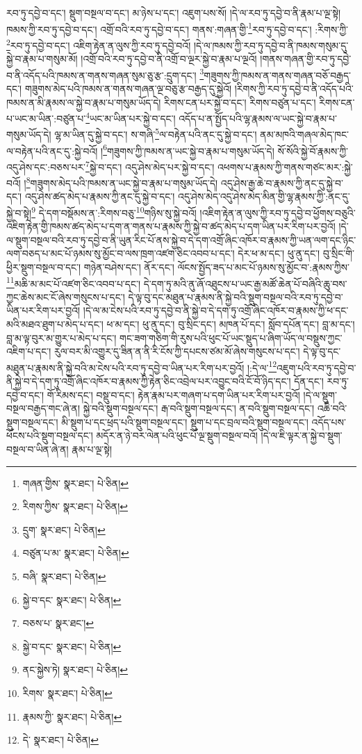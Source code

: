 རབ་ཏུ་དབྱེ་བ་དང་། སྡུག་བསྔལ་བ་དང་། མ་ཉེས་པ་དང་། འཇུག་པས་སོ། །དེ་ལ་རབ་ཏུ་དབྱེ་བ་ནི་རྣམ་པ་ལྔ་སྟེ། ཁམས་ཀྱི་རབ་ཏུ་དབྱེ་བ་དང་། འགྲོ་བའི་རབ་ཏུ་དབྱེ་བ་དང་། གནས་:གཞན་གྱི་\footnote{གཞན་གྱིས་  སྣར་ཐང་།  པེ་ཅིན། }རབ་ཏུ་དབྱེ་བ་དང་། :རིགས་ཀྱི་\footnote{རིགས་ཀྱིས་  སྣར་ཐང་།  པེ་ཅིན། }རབ་ཏུ་དབྱེ་བ་དང་། འཇིག་རྟེན་ན་ལུས་ཀྱི་རབ་ཏུ་དབྱེ་བའོ། །དེ་ལ་ཁམས་ཀྱི་རབ་ཏུ་དབྱེ་བ་ནི་ཁམས་གསུམ་དུ་སྐྱེ་བ་རྣམ་པ་གསུམ་མོ། །འགྲོ་བའི་རབ་ཏུ་དབྱེ་བ་ནི་འགྲོ་བ་ལྔར་སྐྱེ་བ་རྣམ་པ་ལྔའོ། །གནས་གཞན་གྱི་རབ་ཏུ་དབྱེ་བ་ནི་འདོད་པའི་ཁམས་ན་གནས་གཞན་སུམ་ཅུ་རྩ་:དྲུག་དང་། \footnote{དྲུག་  སྣར་ཐང་།  པེ་ཅིན། }གཟུགས་ཀྱི་ཁམས་ན་གནས་གཞན་བཅོ་བརྒྱད་དང་། གཟུགས་མེད་པའི་ཁམས་ན་གནས་གཞན་ལྔ་བཅུ་རྩ་བརྒྱད་དུ་སྐྱེའོ། །རིགས་ཀྱི་རབ་ཏུ་དབྱེ་བ་ནི་འདོད་པའི་ཁམས་ན་མི་རྣམས་ལ་སྐྱེ་བ་རྣམ་པ་གསུམ་ཡོད་དེ། རིགས་ངན་པར་སྐྱེ་བ་དང་། རིགས་བཙུན་པ་དང་། རིགས་ངན་པ་ཡང་མ་ཡིན་:བཙུན་པ་\footnote{བཙུན་པ་མ་  སྣར་ཐང་།  པེ་ཅིན། }ཡང་མ་ཡིན་པར་སྐྱེ་བ་དང་། འདོད་པ་ན་སྤྱོད་པའི་ལྷ་རྣམས་ལ་ཡང་སྐྱེ་བ་རྣམ་པ་གསུམ་ཡོད་དེ། ལྷ་མ་ཡིན་དུ་སྐྱེ་བ་དང་། ས་གཞི་\footnote{བཞི་  སྣར་ཐང་།  པེ་ཅིན། }ལ་བརྟེན་པའི་ནང་དུ་སྐྱེ་བ་དང་། ནམ་མཁའི་གཞལ་མེད་ཁང་ལ་བརྟེན་པའི་ནང་དུ་:སྐྱེ་བའོ། །\footnote{སྐྱེ་བ་དང་  སྣར་ཐང་།  པེ་ཅིན། }གཟུགས་ཀྱི་ཁམས་ན་ཡང་སྐྱེ་བ་རྣམ་པ་གསུམ་ཡོད་དེ། སོ་སོའི་སྐྱེ་བོ་རྣམས་ཀྱི་འདུ་ཤེས་དང་:བཅས་པར་\footnote{བཅས་པ་  སྣར་ཐང་། }སྐྱེ་བ་དང་། འདུ་ཤེས་མེད་པར་སྐྱེ་བ་དང་། འཕགས་པ་རྣམས་ཀྱི་གནས་གཙང་མར་:སྐྱེ་བའོ། །\footnote{སྐྱེ་བ་དང་  སྣར་ཐང་།  པེ་ཅིན། }གཟུགས་མེད་པའི་ཁམས་ན་ཡང་སྐྱེ་བ་རྣམ་པ་གསུམ་ཡོད་དེ། འདུ་ཤེས་རྒྱ་ཆེ་བ་རྣམས་ཀྱི་ནང་དུ་སྐྱེ་བ་དང་། འདུ་ཤེས་ཚད་མེད་པ་རྣམས་ཀྱི་ནང་དུ་སྐྱེ་བ་དང་། འདུ་ཤེས་མེད་འདུ་ཤེས་མེད་མིན་གྱི་ལྷ་རྣམས་ཀྱི་:ནང་དུ་སྐྱེ་བ་སྟེ།\footnote{ནང་སྐྱེས་ཏེ།  སྣར་ཐང་།  པེ་ཅིན། } དེ་དག་བསྡོམས་ན་:རིགས་བཅུ་\footnote{རིགས་  སྣར་ཐང་།  པེ་ཅིན། }གཉིས་སུ་སྐྱེ་བའོ། །འཇིག་རྟེན་ན་ལུས་ཀྱི་རབ་ཏུ་དབྱེ་བ་ཕྱོགས་བཅུའི་འཇིག་རྟེན་གྱི་ཁམས་ཚད་མེད་པ་དག་ན་གནས་པ་རྣམས་ཀྱི་སྐྱེ་བ་ཚད་མེད་པ་དག་ཡིན་པར་རིག་པར་བྱའོ། །དེ་ལ་སྡུག་བསྔལ་བའི་རབ་ཏུ་དབྱེ་བ་ནི་ཡུན་རིང་པོ་ནས་སྐྱེ་བ་དེ་དག་འགྲོ་ཞིང་འཁོར་བ་རྣམས་ཀྱི་ཡན་ལག་དང་ཉིང་ལག་བཅད་པ་མང་པོ་ཉམས་སུ་མྱོང་བ་ལས་ཁྲག་འཛག་ཅིང་འབབ་པ་དང་། དེར་ཕ་མ་དང་། ཕུ་ནུ་དང་། བུ་སྲིང་གི་ཕྱིར་སྡུག་བསྔལ་བ་དང་། གཉེན་བཤེས་དང་། ནོར་དང་། ལོངས་སྤྱོད་ཟད་པ་མང་པོ་ཉམས་སུ་མྱོང་བ་:རྣམས་ཀྱིས་\footnote{རྣམས་ཀྱི་  སྣར་ཐང་།  པེ་ཅིན། }མཆི་མ་མང་པོ་འཛག་ཅིང་འབབ་པ་དང་། དེ་དག་ཏུ་མའི་ནུ་ཞོ་འཐུངས་པ་ཡང་རྒྱ་མཚོ་ཆེན་པོ་བཞིའི་ཆུ་བས་ཀྱང་ཆེས་མང་ངོ་ཞེས་གསུངས་པ་དང་། དེ་ལྟ་བུ་དང་མཐུན་པ་རྣམས་ནི་སྐྱེ་བའི་སྡུག་བསྔལ་བའི་རབ་ཏུ་དབྱེ་བ་ཡིན་པར་རིག་པར་བྱའོ། །དེ་ལ་མ་ངེས་པའི་རབ་ཏུ་དབྱེ་བ་ནི་སྐྱེ་བ་དེ་དག་ཏུ་འགྲོ་ཞིང་འཁོར་བ་རྣམས་ཀྱི་ཕ་དང་མའི་མཐའ་ཐུག་པ་མེད་པ་དང་། ཕ་མ་དང་། ཕུ་ནུ་དང་། བུ་སྲིང་དང་། མཁན་པོ་དང་། སློབ་དཔོན་དང་། བླ་མ་དང་། བླ་མ་ལྟ་བུར་མ་གྱུར་པ་མེད་པ་དང་། གང་ཟག་གཅིག་གི་རུས་པའི་ཕུང་པོ་ཡང་སྡུད་པ་ཞིག་ཡོད་ལ་བསྡུས་ཀྱང་འཇིག་པ་དང་། རུལ་བར་མི་འགྱུར་དུ་ཟིན་ན་ནི་རི་ངོས་ཀྱི་དཔངས་ཙམ་མོ་ཞེས་གསུངས་པ་དང་། དེ་ལྟ་བུ་དང་མཐུན་པ་རྣམས་ནི་སྐྱེ་བའི་མ་ངེས་པའི་རབ་ཏུ་དབྱེ་བ་ཡིན་པར་རིག་པར་བྱའོ། །:དེ་ལ་\footnote{དེ་  སྣར་ཐང་།  པེ་ཅིན། }འཇུག་པའི་རབ་ཏུ་དབྱེ་བ་ནི་སྐྱེ་བ་དེ་དག་ཏུ་འགྲོ་ཞིང་འཁོར་བ་རྣམས་ཀྱི་རྟེན་ཅིང་འབྲེལ་པར་འབྱུང་བའི་ངོ་བོ་ཉིད་དང་། དོན་དང་། རབ་ཏུ་དབྱེ་བ་དང་། གོ་རིམས་དང་། བསྡུ་བ་དང་། རྟེན་རྣམ་པར་གཞག་པ་དག་ཡིན་པར་རིག་པར་བྱའོ། །དེ་ལ་སྡུག་བསྔལ་བརྒྱད་གང་ཞེ་ན། སྐྱེ་བའི་སྡུག་བསྔལ་དང་། རྒ་བའི་སྡུག་བསྔལ་དང་། ན་བའི་སྡུག་བསྔལ་དང་། འཆི་བའི་སྡུག་བསྔལ་དང་། མི་སྡུག་པ་དང་ཕྲད་པའི་སྡུག་བསྔལ་དང་། སྡུག་པ་དང་བྲལ་བའི་སྡུག་བསྔལ་དང་། འདོད་པས་ཕོངས་པའི་སྡུག་བསྔལ་དང་། མདོར་ན་ཉེ་བར་ལེན་པའི་ཕུང་པོ་ལྔ་སྡུག་བསྔལ་བའོ། །དེ་ལ་ཇི་ལྟར་ན་སྐྱེ་བ་སྡུག་བསྔལ་བ་ཡིན་ཞེ་ན། རྣམ་པ་ལྔ་སྟེ། 